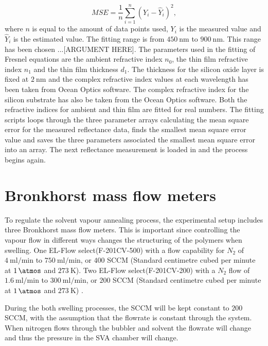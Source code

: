 \documentclass[MasterThesisMain.tex]{subfiles}
\begin{document}
\begin{equation}
MSE = \frac{1}{n}\sum_{i=1}^{n}\left( Y_i - \hat{Y}_i \right)^2,
\end{equation} 
where $n$ is equal to the amount of data points used, $Y_i$ is the measured value and $\hat{Y}_i$ is the estimated value. The fitting range is from $\SI{450}{\nano\meter}$ to $\SI{900}{\nano\meter}$. This range has been chosen ...[ARGUMENT HERE]. The parameters used in the fitting of Fresnel equations are the ambient refractive index $n_0$, the thin film refractive index $n_1$ and the thin film thickness $d_1$. The thickness for the silicon oxide layer is fixed at $\SI{2}{\nano\meter}$ and the complex refractive index values at each wavelength has been taken from Ocean Optics software. The complex refractive index for the silicon substrate has also be taken from the Ocean Optics software. Both the refractive indices for ambient and thin film are fitted for real numbers. The fitting scripts loops through the three parameter arrays calculating the mean square error for the measured reflectance data, finds the smallest mean square error value and saves the three parameters associated the smallest mean square error into an array. The next reflectance measurement is loaded in and the process begins again.

\section{Bronkhorst mass flow meters}
To regulate the solvent vapour annealing process, the experimental setup includes three Bronkhorst mass flow meters. This is important since controlling the vapour flow in different ways changes the structuring of the polymers when swelling. One EL-Flow select(F-201CV-500) with a flow capability for $N_2$ of  $\SI{4}{\milli\litre\per\minute}$ to $\SI{750}{\milli\litre\per\minute}$, or $400$ SCCM (Standard centimetre cubed per minute at $\SI{1}{\atmos}$ and $\SI{273}{\kelvin}$). Two EL-Flow select(F-201CV-200) with a $N_2$ flow of $\SI{1.6}{\milli\litre\per\minute}$ to $\SI{300}{\milli\litre\per\minute}$, or $200$ SCCM (Standard centimetre cubed per minute at $\SI{1}{\atmos}$ and $\SI{273}{\kelvin}$) \cite{elflow}.

During the both swelling processes, the SCCM will be kept constant to $200$ SCCM, with the assumption that the flowrate is constant through the system. When nitrogen flows through the bubbler and solvent the flowrate will change and thus the pressure in the SVA chamber will change. 
\end{document}
